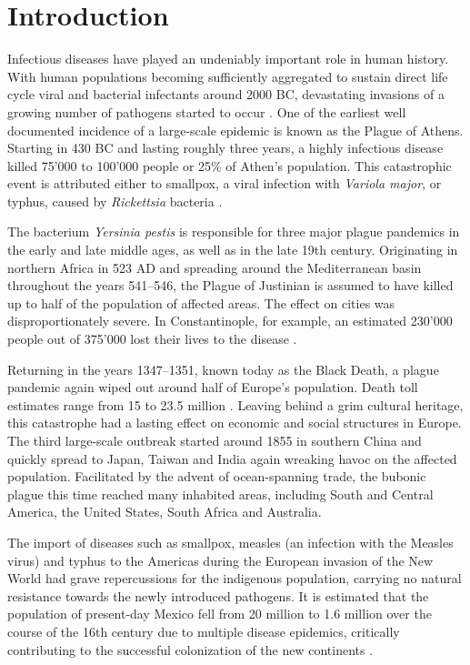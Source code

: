 \chapter{Introduction}

Infectious diseases have played an undeniably important role in human history. With human populations becoming sufficiently aggregated to sustain direct life cycle viral and bacterial infectants around 2000 BC, devastating invasions of a growing number of pathogens started to occur \citep{Dobson1996}. One of the earliest well documented incidence of a large-scale epidemic is known as the Plague of Athens. Starting in 430 BC and lasting roughly three years, a highly infectious disease killed 75'000 to 100'000 people or 25\% of Athen's population. This catastrophic event is attributed either to smallpox, a viral infection with \textit{Variola major}, or typhus, caused by \textit{Rickettsia} bacteria \citep{Littman2009}.

The bacterium \textit{Yersinia pestis} is responsible for three major plague pandemics in the early and late middle ages, as well as in the late 19th century. Originating in northern Africa in 523 AD and spreading around the Mediterranean basin throughout the years 541--546, the Plague of Justinian is assumed to have killed up to half of the population of affected areas. The effect on cities was disproportionately severe. In Constantinople, for example, an estimated 230'000 people out of 375'000 lost their lives to the disease \citep{Treadgold1997}.

Returning in the years 1347--1351, known today as the Black Death, a plague pandemic again wiped out around half of Europe's population. Death toll estimates range from 15 to 23.5 million \citep{Zietz2004}. Leaving behind a grim cultural heritage, this catastrophe had a lasting effect on economic and social structures in Europe. The third large-scale outbreak started around 1855 in southern China and quickly spread to Japan, Taiwan and India again wreaking havoc on the affected population. Facilitated by the advent of ocean-spanning trade, the bubonic plague this time reached many inhabited areas, including South and Central America, the United States, South Africa and Australia.

The import of diseases such as smallpox, measles (an infection with the Measles virus) and typhus to the Americas during the European invasion of the New World had grave repercussions for the indigenous population, carrying no natural resistance towards the newly introduced pathogens. It is estimated that the population of present-day Mexico fell from 20 million to 1.6 million over the course of the 16th century due to multiple disease epidemics, critically contributing to the successful colonization of the new continents \citep{Dobson1996}.

